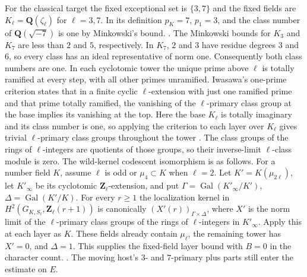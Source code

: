 For the classical target the fixed exceptional set is \(\{3,7\}\)
and the fixed fields are \(K_\ell=\mathbf Q(\zeta_\ell)\) for
\(\ell=3,7\). In its definition \(p_K=7\), \(p_1=3\), and the
class number of \(\mathbf Q(\sqrt{-7})\) is one by Minkowski's bound.
.
The Minkowski bounds for \(K_3\) and \(K_7\) are less than \(2\)
and \(5\), respectively. In \(K_7\), \(2\) and \(3\) have residue
degrees \(3\) and \(6\), so every class has an ideal representative
of norm one. Consequently both class numbers are one.
In each cyclotomic tower the unique prime above \(\ell\) is totally
ramified at every step, with all other primes unramified.
Iwasawa's one-prime criterion states that in a finite cyclic
\(\ell\)-extension with just one ramified prime and that prime
totally ramified, the vanishing of the \(\ell\)-primary class
group at the base implies its vanishing at the top.
Here the base \(K_\ell\) is totally imaginary and its class
number is one, so applying the criterion to each layer over
\(K_\ell\) gives trivial \(\ell\)-primary class groups throughout
the tower \cite[pp.~257--258]{f2-iwasawa-class}. The class groups of
the rings of \(\ell\)-integers are quotients of those groups, so
their inverse-limit \(\ell\)-class module is zero. The
wild-kernel codescent isomorphism is as follows. For a number
field \(K\), assume \(\ell\) is odd or \(\mu_4\subset K\)
when \(\ell=2\). Let \(K'=K(\mu_{2\ell})\), let \(K'_\infty\)
be its cyclotomic \(\mathbf Z_\ell\)-extension, and put
\(\Gamma=\operatorname{Gal}(K'_\infty/K')\),
\(\Delta=\operatorname{Gal}(K'/K)\). For every \(r\ge1\) the
localization kernel in \(H^2(G_{K,S_\ell},\mathbf Z_\ell(r+1))\)
is canonically \((X'(r))_{\Gamma\times\Delta}\), where \(X'\)
is the norm limit of the \(\ell\)-primary class groups of the
rings of \(\ell\)-integers in \(K'_\infty\).
\cite[Theorem~3.1, p.~446]{f2-validire}
Apply this at each layer as \(K\). These fields already contain
\(\mu_\ell\), the remaining tower has \(X'=0\), and \(\Delta=1\).
This supplies the
fixed-field layer bound with \(B=0\) in the character count.
.
The moving host's \(3\)- and \(7\)-primary plus parts still enter
the estimate on \(E\).

